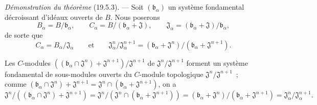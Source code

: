 \begin{env}[19.5.6]
\label{0.19.5.6-fr}
\emph{Démonstration du théorème} (19.5.3). --- Soit
$(\mathfrak b_\alpha)$ un système fondamental décroissant d'idéaux ouverts de
$B$. Nous poserons
\[
  B_\alpha=B/\mathfrak b_\alpha,\qquad
  C_\alpha=B/(\mathfrak b_\alpha+\mathfrak J),\qquad
  \mathfrak J_\alpha=(\mathfrak b_\alpha+\mathfrak J)/\mathfrak b_\alpha,
\]
de sorte que
\[
  C_\alpha=B_\alpha/\mathfrak J_\alpha\qquad\text{et}\qquad
  \mathfrak J_\alpha^n/\mathfrak J_\alpha^{n+1}
  =(\mathfrak b_\alpha+\mathfrak J^n)/(\mathfrak b_\alpha+\mathfrak J^{n+1}).
\]

Les $C$-modules
$((\mathfrak b_\alpha\cap\mathfrak J^n)+\mathfrak J^{n+1})/
\mathfrak J^{n+1}$ de $\mathfrak J^n/\mathfrak J^{n+1}$ forment un système
fondamental de sous-modules ouverts du $C$-module topologique
$\mathfrak J^n/\mathfrak J^{n+1}$~; comme
$(\mathfrak b_\alpha\cap\mathfrak J^n)+\mathfrak J^{n+1}
=\mathfrak J^n\cap(\mathfrak b_\alpha+\mathfrak J^{n+1})$, on a
\[
  \mathfrak J^n/((\mathfrak b_\alpha\cap\mathfrak J^n)+\mathfrak J^{n+1})
  =\mathfrak J^n/(\mathfrak J^n\cap(\mathfrak b_\alpha+\mathfrak J^{n+1}))
  =(\mathfrak b_\alpha+\mathfrak J^n)/(\mathfrak b_\alpha+\mathfrak J^{n+1})
  =\mathfrak J_\alpha^n/\mathfrak J_\alpha^{n+1}.
\]
\end{env}

